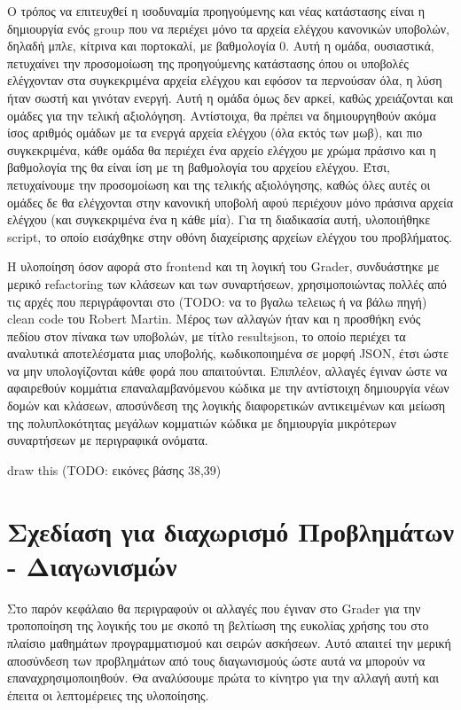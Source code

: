 \documentclass[diploma]{softlab-thesis}
\begin{document}
\bigskip

Ο τρόπος να επιτευχθεί η ισοδυναμία προηγούμενης και νέας κατάστασης είναι η
δημιουργία ενός group που να περιέχει μόνο τα αρχεία ελέγχου κανονικών
υποβολών, δηλαδή μπλε, κίτρινα και πορτοκαλί, με βαθμολογία 0. Αυτή η ομάδα,
ουσιαστικά, πετυχαίνει την προσομοίωση της προηγούμενης κατάστασης όπου οι
υποβολές ελέγχονταν στα συγκεκριμένα αρχεία ελέγχου και εφόσον τα περνούσαν
όλα, η λύση ήταν σωστή και γινόταν ενεργή. Αυτή η ομάδα όμως δεν αρκεί, καθώς
χρειάζονται και ομάδες για την τελική αξιολόγηση. Αντίστοιχα, θα πρέπει να
δημιουργηθούν ακόμα ίσος αριθμός ομάδων με τα ενεργά αρχεία ελέγχου (όλα εκτός
των μωβ), και πιο συγκεκριμένα, κάθε ομάδα θα περιέχει ένα αρχείο ελέγχου με
χρώμα πράσινο και η βαθμολογία της θα είναι ίση με τη βαθμολογία του αρχείου
ελέγχου. Έτσι, πετυχαίνουμε την προσομοίωση και της τελικής αξιολόγησης, καθώς
όλες αυτές οι ομάδες δε θα ελέγχονται στην κανονική υποβολή αφού περιέχουν μόνο
πράσινα αρχεία ελέγχου (και συγκεκριμένα ένα η κάθε μία). Για τη διαδικασία
αυτή, υλοποιήθηκε script, το οποίο εισάχθηκε στην οθόνη διαχείρισης αρχείων
ελέγχου του προβλήματος.

\bigskip

Η υλοποίηση όσον αφορά στο frontend και τη λογική του Grader, συνδυάστηκε με
μερικό refactoring των κλάσεων και των συναρτήσεων, χρησιμοποιώντας πολλές
από τις αρχές που περιγράφονται στο (TODO: να το βγαλω τελειως ή να βάλω πηγή)
clean code του Robert Martin. Μέρος των αλλαγών ήταν και η προσθήκη ενός πεδίου
στον πίνακα των υποβολών, με τίτλο resultsjson, το οποίο περιέχει τα αναλυτικά
αποτελέσματα μιας υποβολής, κωδικοποιημένα σε μορφή JSON, έτσι ώστε να μην
υπολογίζονται κάθε φορά που απαιτούνται. Επιπλέον, αλλαγές έγιναν ώστε να
αφαιρεθούν κομμάτια επαναλαμβανόμενου κώδικα με την αντίστοιχη δημιουργία
νέων δομών και κλάσεων, αποσύνδεση της λογικής διαφορετικών αντικειμένων και
μείωση της πολυπλοκότητας μεγάλων κομματιών κώδικα με δημιουργία μικρότερων
συναρτήσεων με περιγραφικά ονόματα.

\bigskip

draw this
(TODO: εικόνες βάσης 38,39)


\chapter{Σχεδίαση για διαχωρισμό Προβλημάτων - Διαγωνισμών}

Στο παρόν κεφάλαιο θα περιγραφούν οι αλλαγές που έγιναν στο Grader για την
τροποποίηση της λογικής του με σκοπό τη βελτίωση της ευκολίας χρήσης του
στο πλαίσιο μαθημάτων προγραμματισμού και σειρών ασκήσεων. Αυτό απαιτεί την
μερική αποσύνδεση των προβλημάτων από τους διαγωνισμούς ώστε αυτά να μπορούν
να επαναχρησιμοποιηθούν. Θα αναλύσουμε πρώτα το κίνητρο για την αλλαγή αυτή
και έπειτα οι λεπτομέρειες της υλοποίησης.
\end{document}
